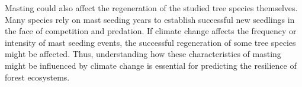 \documentclass[11pt,letter]{article}
\begin{document}
Masting could also affect the regeneration of the studied tree species themselves. Many species rely on mast seeding years to establish successful new seedlings in the face of competition and predation. If climate change affects the frequency or intensity of mast seeding events, the successful regeneration of some tree species might be affected. Thus, understanding how these characteristics of masting might be influenced by climate change is essential for predicting the resilience of forest ecosystems.



 
\end{document}
